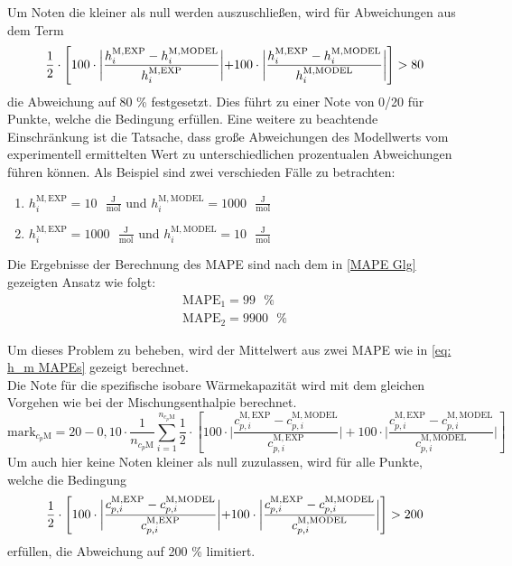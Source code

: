 \documentclass[../thesis.tex]{subfiles}
\begin{document}
Um Noten die kleiner als null werden auszuschließen, wird für Abweichungen aus dem Term
\begin{equation}
	\notag
	\label{eq: h_m MAPEs}
	\dfrac{1}{2} \cdot \left[
	100 \cdot \biggl|
	\dfrac{h_i^{\mathrm{M,EXP}}-h_i^{\mathrm{M,MODEL}}}{h_i^{\mathrm{M,EXP}}} 
	\biggl| 
	+ 100 \cdot \biggl| \dfrac{h_i^{\mathrm{M,EXP}}-h_i^{\mathrm{M,MODEL}}}{h_i^{\mathrm{M,MODEL}}}
	\biggl| \right] > 80
\end{equation}
die Abweichung auf 80 \% festgesetzt. Dies führt zu einer Note von 0/20 für Punkte, welche die Bedingung erfüllen. Eine weitere zu beachtende Einschränkung ist die Tatsache, dass große Abweichungen des Modellwerts vom experimentell ermittelten Wert zu unterschiedlichen prozentualen Abweichungen führen können.
Als Beispiel sind zwei verschieden Fälle zu betrachten:
\begin{enumerate}
	\item $ h_i^{\mathrm{M,EXP}} = 10 \text{ } \mathrm{\frac{J}{mol}} $ und $ h_i^{\mathrm{M,MODEL}} = 1000 \text{ } \mathrm{\frac{J}{mol}} $
	\item $ h_i^{\mathrm{M,EXP}} = 1000 \text{ } \mathrm{\frac{J}{mol}} $ und $ h_i^{\mathrm{M,MODEL}} = 10 \text{ } \mathrm{\frac{J}{mol}} $
\end{enumerate}
Die Ergebnisse der Berechnung des MAPE sind nach dem in \autoref{MAPE Glg} gezeigten Ansatz wie folgt:
\begin{eqnarray}
\mathrm{MAPE}_1 = 99 \text{ } \% \\
\mathrm{MAPE}_2 = 9900  \text{ } \%
\end{eqnarray}

Um dieses Problem zu beheben, wird der Mittelwert aus zwei MAPE wie in \autoref{eq: h_m MAPEs} gezeigt berechnet.
\\

Die Note für die spezifische isobare Wärmekapazität wird mit dem gleichen Vorgehen wie bei der Mischungsenthalpie berechnet.
\begin{equation}
\mathrm{mark}_{c_p{\mathrm{M}}} = 20 - 0,10 \cdot \dfrac{1}{n_{c_p{\mathrm{M}}}} \sum_{i=1}^{n_{c_p{\mathrm{M}}}}
\dfrac{1}{2} \cdot \left[
100 \cdot \biggl|
\dfrac{c_{p,i}^{\mathrm{M,EXP}}-c_{p,i}^{\mathrm{M,MODEL}}}{c_{p,i}^{\mathrm{M,EXP}}} 
\biggl| 
+ 100 \cdot \biggl| \dfrac{c_{p,i}^{\mathrm{M,EXP}}-c_{p,i}^{\mathrm{M,MODEL}}}{c_{p,i}^{\mathrm{M,MODEL}}}
\biggl|
\right]
\label{eq: cp MAPEs}
\end{equation}
Um auch hier keine Noten kleiner als null zuzulassen, wird für alle Punkte, welche die Bedingung 
\begin{equation}
\notag
\dfrac{1}{2} \cdot \left[
100 \cdot \biggl|
\dfrac{c_{p,i}^{\mathrm{M,EXP}}-c_{p,i}^{\mathrm{M,MODEL}}}{c_{p,i}^{\mathrm{M,EXP}}} 
\biggl| 
+ 100 \cdot \biggl| \dfrac{c_{p,i}^{\mathrm{M,EXP}}-c_{p,i}^{\mathrm{M,MODEL}}}{c_{p,i}^{\mathrm{M,MODEL}}}
\biggl| \right]> 200
\end{equation}
erfüllen, die Abweichung auf 200 \% limitiert.
\end{document}
